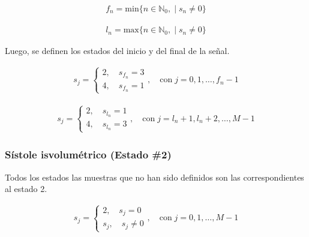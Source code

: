 \begin{align} \label{eq:min-index}
    f_n = \mathrm{min}\big\{ n \in \mathbb{N}_0, \; | \; s_n \neq 0  \big\}
\end{align}

\begin{align} \label{eq:max-index}
    l_n = \mathrm{max}\big\{ n \in \mathbb{N}_0, \; | \; s_n \neq 0  \big\}
\end{align}

\indent Luego, se definen los estados del inicio y del final de la señal.

\begin{align}
    s_j = \begin{cases}
        2, \quad s_{f_n} = 3  \\
        4, \quad s_{f_n} = 1
        \end{cases}, \quad \mathrm{con} \; j = 0,1,\dots,f_n-1
\end{align}

\begin{align}
    s_j = \begin{cases}
        2, \quad s_{l_n} = 1  \\
        4, \quad s_{l_n} = 3
        \end{cases}, \quad \mathrm{con} \; j = l_n+1,l_n+2,\dots,M-1
\end{align}

\subsubsection*{Sístole isvolumétrico (Estado \#2)}

\indent Todos los estados las muestras que no han sido definidos son las correspondientes al estado 2.

\begin{align}
    s_j = \begin{cases}
        2, \quad s_j = 0  \\
        s_j, \quad s_j \neq 0
        \end{cases}, \quad \mathrm{con} \; j = 0,1,\dots,M-1
\end{align}



